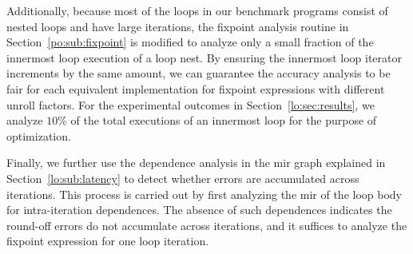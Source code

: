 Additionally, because most of the loops in our benchmark programs consist
of nested loops and have large iterations, the fixpoint analysis routine
in Section~\ref{po:sub:fixpoint} is modified to analyze only a small
fraction of the innermost loop execution of a loop nest.  By ensuring the
innermost loop iterator increments by the same amount, we can guarantee the
accuracy analysis to be fair for each equivalent implementation for fixpoint
expressions with different unroll factors.  For the experimental outcomes in
Section~\ref{lo:sec:results}, we analyze $10\%$ of the total executions of an
innermost loop for the purpose of optimization.

Finally, we further use the dependence analysis in the \gls{mir} graph
explained in Section~\ref{lo:sub:latency} to detect whether errors are
accumulated across iterations.  This process is carried out by first analyzing
the \gls{mir} of the loop body for intra-iteration dependences.  The absence
of such dependences indicates the round-off errors do not accumulate across
iterations, and it suffices to analyze the fixpoint expression for one loop
iteration.
